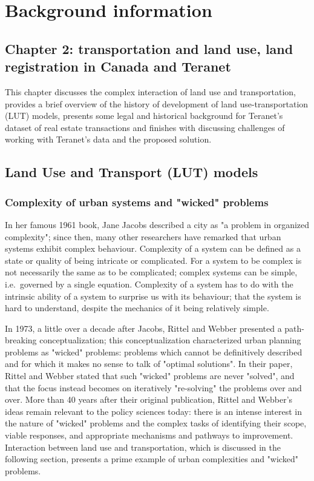 \chapter[Background information]{Background information} \label{ch:background}

\section{Chapter 2: transportation and land use, land registration in Canada and Teranet} \label{sec:chapter_2_intro}

This chapter discusses the complex interaction of land use and transportation, provides a brief overview of the history of development of land use-transportation (LUT) models, presents some legal and historical background for Teranet's dataset of real estate transactions and finishes with discussing challenges of working with Teranet's data and the proposed solution.

\section{Land Use and Transport (LUT) models} \label{sec:evolution_of_models_of_urban_systems}

\subsection{Complexity of urban systems and "wicked" problems} \label{subsec:complexity_and_wicked_problems}

In her famous 1961 book, Jane Jacobs\cite{Jacobs1961} described a city as "a problem in organized complexity";
since then, many other researchers have remarked that urban systems exhibit complex behaviour\cite{Batty2008, Bettencourt2013}.
Complexity of a system can be defined as a state or quality of being intricate or complicated.
For a system to be complex is not necessarily the same as to be complicated;
complex systems can be simple, i.e.\ governed by a single equation.
Complexity of a system has to do with the intrinsic ability of a system to surprise us with its behaviour;
that the system is hard to understand, despite the mechanics of it being relatively simple.

In 1973, a little over a decade after Jacobs, Rittel and Webber\cite{Rittel1973} presented a path-breaking conceptualization;
this conceptualization characterized urban planning problems as "wicked" problems: problems which cannot be definitively described and for which it makes no sense to talk of "optimal solutions".
In their paper, Rittel and Webber stated that such "wicked" problems are never "solved", and that the focus instead becomes on iteratively "re-solving" the problems over and over.
More than 40 years after their original publication, Rittel and Webber's ideas remain relevant to the policy sciences today: there is an intense interest in the nature of "wicked" problems and the complex tasks of identifying their scope, viable responses, and appropriate mechanisms and pathways to improvement\cite{Crowley2017}.
Interaction between land use and transportation, which is discussed in the following section, presents a prime example of urban complexities and "wicked" problems.

